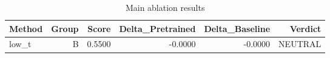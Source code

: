 \begin{table}[htbp]
\centering
\caption{Main ablation results}
\label{tab:main-results}
\begin{tabular}{lrrrrr}
\toprule
\textbf{Method} & \textbf{Group} & \textbf{Score} & \textbf{Delta\_Pretrained} & \textbf{Delta\_Baseline} & \textbf{Verdict} \\
\midrule
low\_t & B & 0.5500 & -0.0000 & -0.0000 & NEUTRAL \\
\bottomrule
\end{tabular}
\end{table}